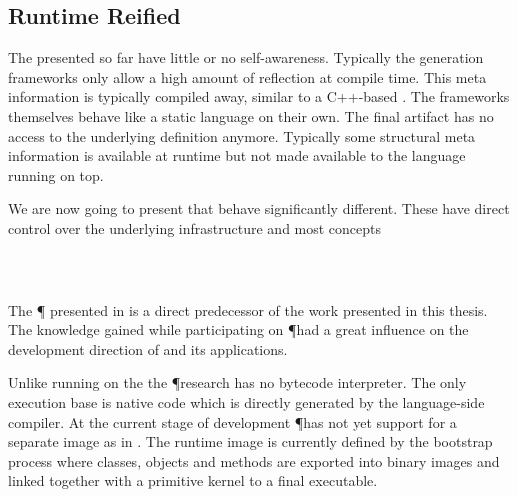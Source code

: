 

\subsection{Runtime Reified \VMs}

The \VMs presented so far have little or no self-awareness.
Typically the \VM generation frameworks only allow a high amount of reflection at \VM compile time.
This meta information is typically compiled away, similar to a C++-based \VM.
The \VM frameworks themselves behave like a static language on their own.
The final \VM artifact has no access to the underlying definition anymore.
Typically some structural meta information is available at runtime but not made available to the language running on top.

We are now going to present \VMs that behave significantly different.
These \VMs have direct control over the underlying infrastructure and most concepts
\\
 \\
\\


\subsubsection*{\Pinocchio \VM}

The \P \VM \cite{Verw11a} presented in  is a direct predecessor of the work presented in this thesis.
The knowledge gained while participating on \P had a great influence on the development direction of \B and its applications.

Unlike \PH running on the \Cog \VM the \P research \VM has no bytecode interpreter.
The only execution base is native code which is directly generated by the language-side compiler.
At the current stage of development \P has not yet support for a separate image as in \PH.
The runtime image is currently defined by the bootstrap process where classes, objects and methods are exported into binary images and linked together with a primitive kernel to a final executable.

